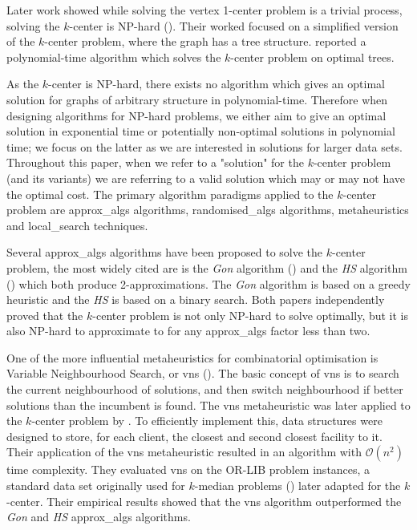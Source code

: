 Later work showed while solving the vertex 1-center problem is a trivial process, solving the $k$-center is NP-hard (\cite{kariv_algorithmic_1979}). Their worked focused on a simplified version of the $k$-center problem, where the graph has a \gls{tree} structure. \textcite{kariv_algorithmic_1979} reported a polynomial-time algorithm which solves the $k$-center problem on optimal trees.

As the $k$-center is NP-hard, there exists no algorithm which gives an optimal solution for graphs of arbitrary structure in polynomial-time. Therefore when designing algorithms for NP-hard problems, we either aim to give an optimal solution in exponential time or potentially non-optimal solutions in polynomial time; we focus on the latter as we are interested in solutions for larger data sets. Throughout this paper, when we refer to a "solution" for the $k$-center problem (and its variants) we are referring to a valid solution which may or may not have the optimal cost. The primary algorithm paradigms applied to the $k$-center problem are \gls{approx_algs} algorithms, \gls{randomised_algs} algorithms, \glspl{metaheuristic} and \gls{local_search} techniques.

Several \gls{approx_algs} algorithms have been proposed to solve the $k$-center problem, the most widely cited are is the \emph{Gon} algorithm (\cite{gonzalez_clustering_1985}) and the \emph{HS} algorithm (\cite{hochbaum_best_1985}) which both produce 2-approximations. The \emph{Gon} algorithm is based on a greedy \gls{heuristic} and the \emph{HS} is based on a binary search. Both papers independently proved that the $k$-center problem is not only NP-hard to solve optimally, but it is also NP-hard to approximate to for any \gls{approx_algs} factor less than two.

One of the more influential \glspl{metaheuristic} for combinatorial optimisation is Variable Neighbourhood Search, or \acrshort{vns} (\cite{mladenovic_variable_1997}). The basic concept of \acrshort{vns} is to search the current neighbourhood of solutions, and then switch neighbourhood if better solutions than the incumbent is found. The \acrshort{vns} metaheuristic was later applied to the $k$-center problem by \textcite{mladenovic_solving_2003}. To efficiently implement this, data structures were designed to store, for each client, the closest and second closest facility to it. Their application of the \acrshort{vns} metaheuristic resulted in an algorithm with $\mathcal{O}(n^{2})$ time complexity. They evaluated \acrshort{vns} on the OR-LIB problem instances, a standard data set originally used for $k$-median problems (\cite{beasley_note_1985}) later adapted for the $k$-center. Their empirical results showed that the \acrshort{vns} algorithm outperformed the \emph{Gon} and \emph{HS} \gls{approx_algs} algorithms.

